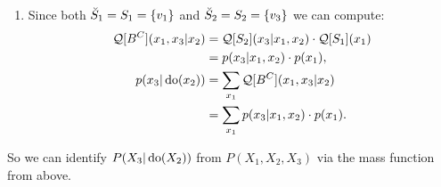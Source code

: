 \begin{Eg}
\begin{enumerate}
\begin{enumerate}
\begin{align*}
                    \end{align*}
                \item $A_{2,1} = \Anc^{[D_{2,0}]}(S_1) = \lC v_3  \rC = D_{2,0}$. thus $\idc S_2 = D_{2,0}$. Compute:
                 \begin{align*}
               \Qf[\idc S_2](x_3|x_1,x_2)  = \Qf[D_{2,0}](x_3|x_1,x_2)  = p(x_3|x_1,x_2).
                    \end{align*}
                \item $S_2 = \lC v_3 \rC =\idc S_2$. Compute:
                 \begin{align*}
               \Qf[S_2](x_3|x_1,x_2)  = \Qf[\idc S_2](x_3|x_1,x_2)  = p(x_3|x_1,x_2).
                    \end{align*}
            \end{enumerate}
        \item Since both $\breve{S}_1 = S_1 = \left \{ v_1 \right \}$ and $\breve{S}_2 =S_2 = \left \{ v_3\right \}$ we can compute:
               \begin{align*}
                   \mathcal{Q}[B^C](x_1,x_3|x_2) &= \mathcal{Q}[S_2](x_3|x_1,x_2) \cdot \mathcal{Q}[S_1](x_1) \\ 
                                         &= p(x_3|x_1,x_2) \cdot p(x_1), \\
                   p(x_3|\operatorname{do}(x_2)) & = \sum_{x_1} \mathcal{Q}[B^C](x_1,x_3|x_2) \\ 
                   & = \sum_{x_1} p(x_3|x_1,x_2) \cdot p(x_1). 
               \end{align*}
    \end{enumerate}
    So we can identify $P(X_3|\operatorname{do}(X_2))$ from $P(X_1,X_2,X_3)$ via the mass function from above.
\end{Eg}

